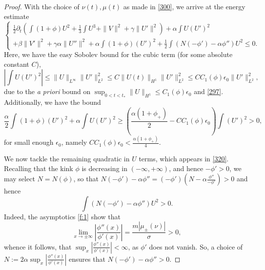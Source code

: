 \documentclass[10pt,a4paper]{amsart}
\newcommand{\al}{\alpha}
\newcommand{\be}{\beta}
\newcommand{\eps}{\epsilon}
\newcommand{\f}[2]{\frac{#1}{#2}}
\newcommand{\ga}{\gamma}
\newcommand{\p}{\partial}
\newcommand{\si}{\sigma}
\begin{document}
\begin{proof}
% 
With the choice of $\nu(t), \mu(t)$ as made in \eqref{300},  we arrive at the energy estimate 
\begin{equation}
	\label{320} 
	\begin{cases}
		\f{1}{2}  \p_t\left( \int (1+ \phi) U^2+\f{1}{3} \int U^3+\|V\|^2+ \ga \|U'\|^2 \right) + \al \int  U (U')^2\\
		+  \be\|V'\|^2 +  \ga \al \|U''\|^2+ \al  \int (1+ \phi) (U')^2 +\f{1}{2}  \int  (N (-\phi') - \al \phi'')  U^2  \leq 0.
	\end{cases}
\end{equation} 
Here, we have the easy Sobolev bound for the cubic term (for some absolute constant $C$), 
$$
 \left|\int  U (U')^2\right|  \leq \|U\|_{L^\infty} \|U'\|_{L^2}^2\leq C \|U(t)\|_{H^1} \|U'\|_{L^2}^2\leq C  C_1(\phi) \eps_0\|U'\|_{L^2}^2,
$$
due to the {\it a priori} bound on $\sup_{0<t<t_*} \|U\|_{H^1}\leq C_1(\phi)\eps_0$ and \eqref{297}. 
Additionally, we have the bound 
$$
 \f{\al}{2}   \int (1+ \phi) (U')^2 +\al  \int  U (U')^2\geq  \left(\f{\al(1+\phi_+)}{2} -CC_1(\phi) \eps_0\right)  \int (U')^2 >0, 
$$
for small enough $\eps_0$, namely $CC_1(\phi) \eps_0<\f{\al(1+\phi_+)}{4} $. 

We now tackle the remaining quadratic in $U$ terms, which appears in \eqref{320}. 
 Recalling that the kink $\phi$ is decreasing in $(-\infty, +\infty)$, and hence $-\phi'>0$, we may select $N=N(\phi)$, so that $N (-\phi') - \al \phi''=(-\phi')\left(N-\al\f{\phi''}{-\phi'}\right)>0$ and hence $$
 \int  (N (-\phi') - \al \phi'')  U^2>0.
 $$
  Indeed, the asymptotics \eqref{f:1} show that 
$$
\lim_{x\to \pm \infty} \left|\frac{\phi''(x)}{\phi'(x)}\right|= \f{m|\mu_{\pm}(\nu)|}{\si}>0, 
$$
whence it follows,  that $\sup_{x} \left|\frac{\phi''(x)}{\phi'(x)}\right|<\infty$, as $\phi'$ does not vanish. So, a choice of $N:=2\al \sup_{x} \left|\frac{\phi''(x)}{\phi'(x)}\right|$ ensures that $N (-\phi') - \al \phi''>0$. 
 



\end{proof}
\end{document}

